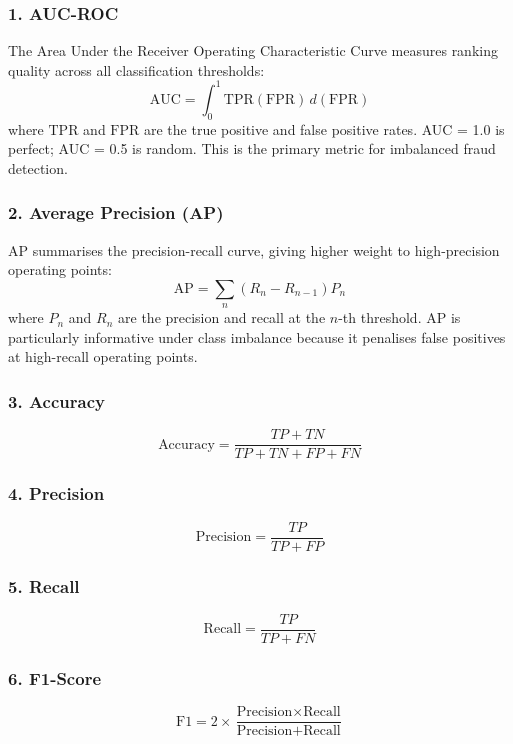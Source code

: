 \subsubsection*{1. AUC-ROC}
The Area Under the Receiver Operating Characteristic Curve measures ranking quality across all classification thresholds:
\begin{equation}
\text{AUC} = \int_{0}^{1} \text{TPR}(\text{FPR}) \, d(\text{FPR})
\end{equation}
where \(\text{TPR}\) and \(\text{FPR}\) are the true positive and false positive rates. AUC = 1.0 is perfect; AUC = 0.5 is random. This is the primary metric for imbalanced fraud detection.

\subsubsection*{2. Average Precision (AP)}
AP summarises the precision-recall curve, giving higher weight to high-precision operating points:
\begin{equation}
\text{AP} = \sum_n (R_n - R_{n-1}) P_n
\end{equation}
where \(P_n\) and \(R_n\) are the precision and recall at the \(n\)-th threshold. AP is particularly informative under class imbalance because it penalises false positives at high-recall operating points.

\subsubsection*{3. Accuracy}
\begin{equation}
\text{Accuracy} = \frac{TP + TN}{TP + TN + FP + FN}
\end{equation}

\subsubsection*{4. Precision}
\begin{equation}
\text{Precision} = \frac{TP}{TP + FP}
\end{equation}

\subsubsection*{5. Recall}
\begin{equation}
\text{Recall} = \frac{TP}{TP + FN}
\end{equation}

\subsubsection*{6. F1-Score}
\begin{equation}
\text{F1} = 2 \times \frac{\text{Precision} \times \text{Recall}}{\text{Precision} + \text{Recall}}
\end{equation}

